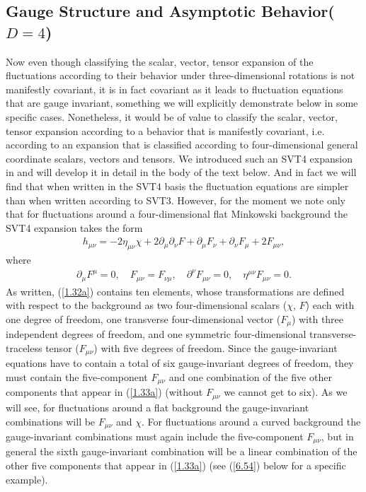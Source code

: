 \subsection{Gauge Structure and Asymptotic Behavior($D=4$)}
\label{S1e}
%
Now even though classifying the scalar, vector, tensor expansion of the fluctuations according to their behavior under three-dimensional rotations is not manifestly covariant, it is in fact covariant as it leads to fluctuation equations that are gauge invariant, something we will explicitly demonstrate below in some specific cases. Nonetheless, it would be of value to classify the scalar, vector, tensor expansion according to a behavior that is manifestly covariant, i.e. according to an expansion that is classified according to four-dimensional general coordinate scalars, vectors and tensors. We introduced such an SVT4 expansion in \cite{Amarasinghe2018} and will develop it in detail in the body of the text below. And in fact we will find that when written in the SVT4 basis the fluctuation equations are simpler than when written according to SVT3. However, for the moment we note only that for fluctuations around a four-dimensional flat Minkowski background the SVT4 expansion takes the form 
%
\begin{eqnarray}
h_{\mu\nu}=-2\eta_{\mu\nu}\chi+2\partial_{\mu}\partial_{\nu}F
+ \partial_{\mu}F_{\nu}+\partial_{\nu}F_{\mu}+2F_{\mu\nu},
\label{1.32a}
\end{eqnarray}
%
where 
%
\begin{eqnarray}
\partial_{\mu} F^{\mu}= 0, \quad F_{\mu\nu}=F_{\nu\mu},\quad \partial^{\nu}F_{\mu\nu} = 0, \quad \eta^{\mu\nu}F_{\mu\nu} = 0.
\label{1.33a}
\end{eqnarray}
%
As written, (\ref{1.32a}) contains ten elements, whose transformations are defined with respect to the background as two four-dimensional scalars ($\chi$, $F$) each with one degree of freedom, one transverse four-dimensional vector  ($F_{\mu}$) with three independent degrees of freedom, and one symmetric four-dimensional transverse-traceless tensor ($F_{\mu\nu}$) with five degrees of freedom. Since the gauge-invariant equations have to  contain a total of six gauge-invariant degrees of freedom, they must contain the five-component $F_{\mu\nu}$ and one combination of the five other components that appear in (\ref{1.33a}) (without $F_{\mu\nu}$ we cannot get to six). As we will see, for fluctuations around a flat background the gauge-invariant combinations will be $F_{\mu\nu}$ and $\chi$. For fluctuations around a curved background the gauge-invariant combinations must again include the five-component $F_{\mu\nu}$, but in general the sixth gauge-invariant combination will be a linear combination of the other five components that appear in (\ref{1.33a}) (see (\ref{6.54}) below for a specific example).


